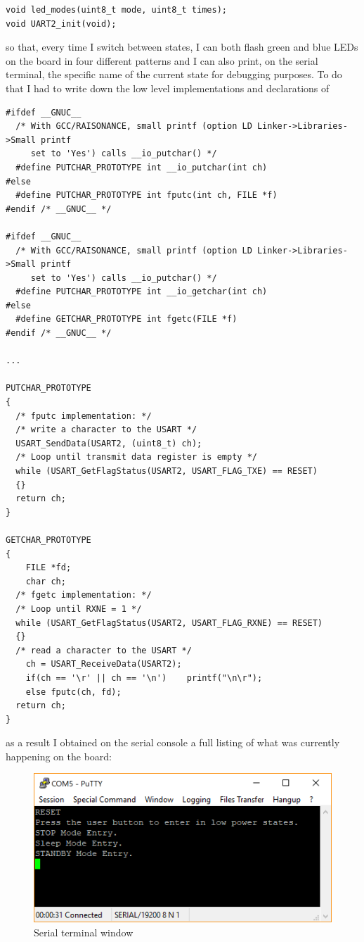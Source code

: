 \documentclass[peerreview]{IEEEtran}
\begin{document}
\begin{lstlisting}[style=CStyle]
void led_modes(uint8_t mode, uint8_t times);
void UART2_init(void);
\end{lstlisting}
so that, every time I switch between states, I can both flash green and blue LEDs on the board in four different patterns  and I can also print, on the serial terminal, the specific name of the current state for debugging purposes. To do that I had to write down the low level implementations and declarations of
\begin{lstlisting}[style=CStyle]
#ifdef __GNUC__
  /* With GCC/RAISONANCE, small printf (option LD Linker->Libraries->Small printf
     set to 'Yes') calls __io_putchar() */
  #define PUTCHAR_PROTOTYPE int __io_putchar(int ch)
#else
  #define PUTCHAR_PROTOTYPE int fputc(int ch, FILE *f)
#endif /* __GNUC__ */
	
#ifdef __GNUC__
  /* With GCC/RAISONANCE, small printf (option LD Linker->Libraries->Small printf
     set to 'Yes') calls __io_putchar() */
  #define PUTCHAR_PROTOTYPE int __io_getchar(int ch)
#else
  #define GETCHAR_PROTOTYPE int fgetc(FILE *f)
#endif /* __GNUC__ */

...

PUTCHAR_PROTOTYPE
{
  /* fputc implementation: */
  /* write a character to the USART */
  USART_SendData(USART2, (uint8_t) ch);
  /* Loop until transmit data register is empty */
  while (USART_GetFlagStatus(USART2, USART_FLAG_TXE) == RESET)
  {}
  return ch;
}

GETCHAR_PROTOTYPE
{
	FILE *fd;
	char ch;
  /* fgetc implementation: */
  /* Loop until RXNE = 1 */
  while (USART_GetFlagStatus(USART2, USART_FLAG_RXNE) == RESET)
  {}
  /* read a character to the USART */
	ch = USART_ReceiveData(USART2);
	if(ch == '\r' || ch == '\n')	printf("\n\r");
	else fputc(ch, fd);
  return ch;
}
\end{lstlisting}
as a result I obtained on the serial console a full listing of what was currently happening on the board:\\
\begin{figure}[!ht]
\centering
\includegraphics[width=0.8\columnwidth]{serial} 
\caption{Serial terminal window}
\label{fig_serial}
\end{figure}
\end{document}
